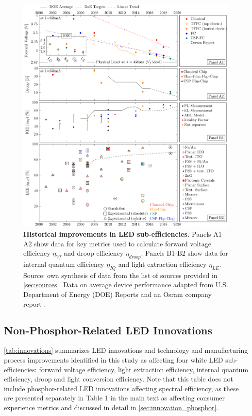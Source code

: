 \documentclass[parskip=full]{article}
\begin{document}
\begin{figure}[H]
\centering
\includegraphics[width=15.5cm]{./figures/subefficiencies_progress.pdf}
\caption{\textbf{Historical improvements in LED sub-efficiencies.} Panels A1-A2 show data for key metrics used to calculate forward voltage efficiency $\eta_{Vf}$ and droop efficiency $\eta_{droop}$. Panels B1-B2 show data for internal quantum efficiency $\eta_{IQ}$ and light extraction efficiency $\eta_{LE}$. Source: own synthesis of data from the list of sources provided in \cref{sec:sources}. Data on average device performance adapted from U.S. Department of Energy (DOE) Reports \cite{doe_ssl_multiyear_2007}\cite{doe_ssl_multiyear_2008}\cite{doe_ssl_multiyear_2013}\cite{doe_ssl_rnd_2016}\cite{doe_ssl_rnd_2018} and an Osram company report \cite{beale_leds_2015}.}
\label{fgr:subeff}
\end{figure}

\clearpage
\subsection{Non-Phosphor-Related LED Innovations}

\cref{tab:innovations} summarizes LED innovations and technology and manufacturing process improvements identified in this study as affecting four white LED sub-efficiencies: forward voltage efficiency, light extraction efficiency, internal quantum efficiency, droop and light conversion efficiency. Note that this table does not include phosphor-related LED innovations affecting spectral efficiency, as these are presented separately in Table 1 in the main text as affecting consumer experience metrics and discussed in detail in \cref{sec:innovation_phosphor}.
\end{document}
